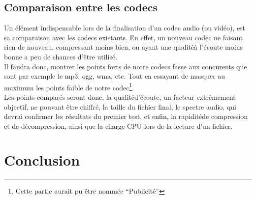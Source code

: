 \documentclass[a4paper,12pt]{article}
\begin{document}
	\subsection{Comparaison entre les codecs}
Un \'el\'ement indispensable lors de la finalisation d'un codec audio (ou vid\'eo),
est sa comparaison avec les codecs existants. En effet, un nouveau codec ne
faisant rien de nouveau, compressant moins bien, ou ayant une qualit\'eà l'\'ecoute
moins bonne a peu de chances d'\^etre utilis\'e.\\
Il faudra donc, montrer les points forts de notre codecs fasse aux concurents
que sont par exemple le mp3, ogg, wma, etc. Tout en essayant de masquer au
maximum les points faible de notre codec\footnote{Cette partie aurait pu \^etre
nomm\'ee ``Publicit\'e''}.\\
Les points compar\'es seront donc, la qualit\'ed'\'ecoute, un facteur extr\^emement
objectif, ne pouvant \^etre chiffr\'e, la taille du fichier final, le spectre audio,
qui devrai confirmer les r\'esultats du premier test, et enfin, la rapidit\'ede
compression et de d\'ecompression, ainsi que la charge CPU lors de la lecture d'un
fichier.

\newpage

\section*{Conclusion}
\end{document}
